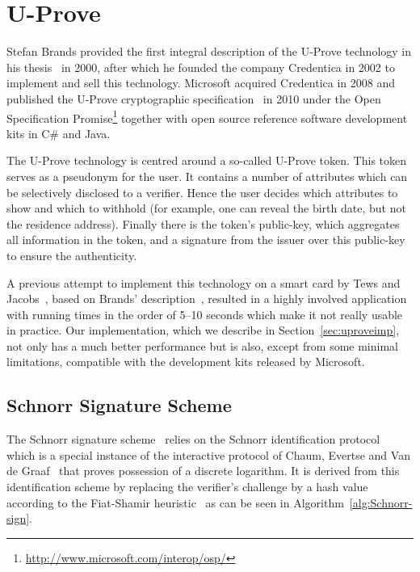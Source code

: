 \chapter{U-Prove}

Stefan Brands provided the first integral description of the U-Prove technology
in his thesis~\cite{Brands2000} in 2000, after which he founded the company
Credentica in 2002 to implement and sell this technology. Microsoft acquired
Credentica in 2008 and published the U-Prove cryptographic
specification~\cite{U-Prove_Crypto2010, U-Prove_Crypto2013} in 2010 under the
Open Specification Promise\footnote{\url{http://www.microsoft.com/interop/osp/}}
together with open source reference software development kits in C\# and Java.

The U-Prove technology is centred around a so-called U-Prove token. This token
serves as a pseudonym for the user. It contains a number of attributes which can
be selectively disclosed to a verifier. Hence the user decides which attributes
to show and which to withhold (for example, one can reveal the birth date, but
not the residence address). Finally there is the token's public-key, which
aggregates all information in the token, and a signature from the issuer over
this public-key to ensure the authenticity.

A previous attempt to implement this technology on a smart card by Tews and
Jacobs~\cite{TewsJacobs09}, based on Brands' description~\cite{Brands2000},
resulted in a highly involved application with running times in the order of
5--10 seconds which make it not really usable in practice. Our implementation,
which we describe in Section~\ref{sec:uproveimp}, not only has a much better
performance but is also, except from some minimal limitations, compatible with
the development kits released by Microsoft.

\section{Schnorr Signature Scheme}

The Schnorr signature scheme~\cite{Schnorr1989,Schnorr1991} relies on the
Schnorr identification protocol~\cite{Schnorr1989} which is a special instance
of the interactive protocol of Chaum, Evertse and Van de
Graaf~\cite{ChaumEvdG1988} that proves possession of a discrete logarithm. It
is derived from this identification scheme by replacing the verifier's challenge
by a hash value according to the Fiat-Shamir heuristic~\cite{FiatShamir1987} as
can be seen in Algorithm~\ref{alg:Schnorr-sign}.

